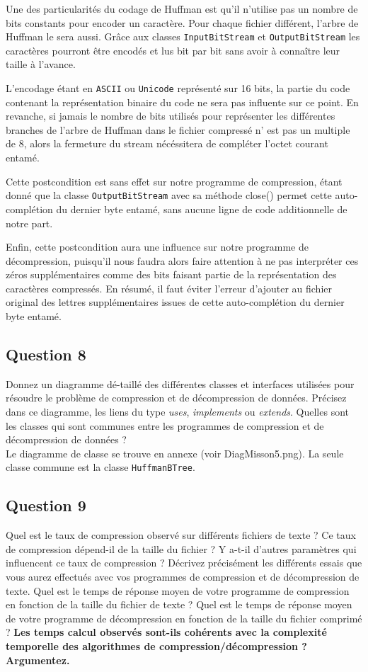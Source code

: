 \documentclass[11pt]{article}
\begin{document}
Une des particularités du codage de Huffman est qu'il n'utilise pas un nombre de bits constants pour encoder un caractère. Pour chaque fichier différent, l'arbre de Huffman le sera aussi. Grâce aux classes \verb+InputBitStream+ et \verb+OutputBitStream+ les caractères pourront être encodés et lus bit par bit sans avoir à connaître leur taille à l'avance.

L'encodage étant en \verb+ASCII+ ou \verb+Unicode+ représenté sur 16 bits, la partie du code contenant la représentation binaire du code ne sera pas influente sur ce point. En revanche, si jamais le nombre de bits utilisés pour représenter les différentes branches de l'arbre de Huffman dans le fichier compressé n' est pas un multiple de 8, alors la fermeture du stream nécéssitera de compléter l'octet courant entamé.

Cette postcondition est sans effet sur notre programme de compression, étant donné que la classe \verb+OutputBitStream+ avec sa méthode close() permet cette auto-complétion du dernier byte entamé, sans aucune ligne de code additionnelle de notre part.

Enfin, cette postcondition aura une influence sur notre programme de décompression, puisqu'il nous faudra alors faire attention à ne pas interpréter ces zéros supplémentaires comme des bits faisant partie de la représentation des caractères compressés. En résumé, il faut éviter l'erreur d'ajouter au fichier original des lettres supplémentaires issues de cette auto-complétion du dernier byte entamé.


\subsection*{Question 8}
Donnez un diagramme dé-taillé des différentes classes et interfaces utilisées pour résoudre le problème de compression et de décompression de données. Précisez dans ce diagramme, les liens du type \textit{uses}, \textit{implements} ou \textit{extends}. Quelles sont les classes qui sont communes entre les programmes de compression et de décompression de données ? \\

Le diagramme de classe se trouve en annexe (voir DiagMisson5.png). La seule classe commune est la classe \verb+HuffmanBTree+.


\subsection*{Question 9}
Quel est le taux de compression observé sur différents fichiers de texte ? Ce taux de compression dépend-il de la taille du fichier ? Y a-t-il d'autres paramètres qui influencent ce taux de compression ? Décrivez précisément les différents essais que vous aurez effectués avec vos programmes de compression et de décompression de texte. Quel est le temps de réponse moyen de votre programme de compression en fonction de la taille du fichier de texte ? Quel est le temps de réponse moyen de votre programme de décompression en fonction de la taille du fichier comprimé ? \textbf{Les temps calcul observés sont-ils cohérents avec la complexité temporelle des algorithmes de compression/décompression ? Argumentez.} \\
\end{document}
